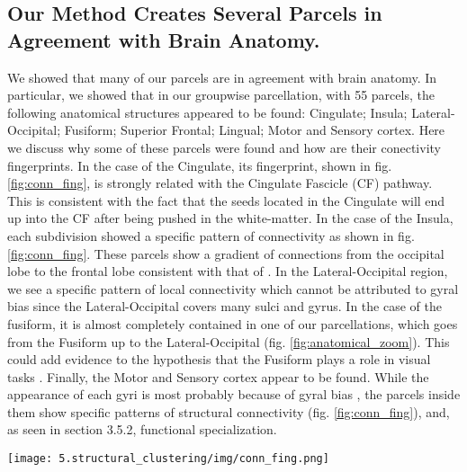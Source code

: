 \subsection{Our Method Creates Several Parcels in Agreement with Brain Anatomy.}
%
We showed that many of our parcels are in agreement with brain anatomy. 
In particular, we showed that in our groupwise parcellation, with 55 parcels,
the following anatomical structures appeared to be found: Cingulate; Insula;
Lateral-Occipital; Fusiform; Superior Frontal; Lingual; Motor and Sensory cortex.
Here we discuss why some of these parcels were found and how are their 
conectivity fingerprints.
In the case of the Cingulate, its fingerprint, shown in fig. \ref{fig:conn_fing}, is
strongly related with the Cingulate Fascicle (CF) pathway. This
is consistent with the 
fact that the seeds located in the Cingulate will end up into the CF after being 
pushed in the white-matter. In the case of the Insula, each subdivision
showed a specific pattern of connectivity as shown in fig. \ref{fig:conn_fing}. 
These parcels show a gradient of connections from the occipital lobe to the frontal
lobe consistent with that of \citet{Ghaziri2015}. In the
Lateral-Occipital region, we see a specific pattern of local connectivity which
cannot be attributed to gyral bias since the Lateral-Occipital covers many sulci
and gyrus. In the case of the fusiform, it is almost completely contained in one
of our parcellations, which goes from the Fusiform up to the Lateral-Occipital
(fig. \ref{fig:anatomical_zoom}). 
This could add evidence to the hypothesis that the Fusiform plays a role in visual
tasks \citep{Kanwisher2006, Yeatman2014}. Finally, the Motor and Sensory cortex appear to be
found. While the
appearance of each gyri is most probably because of gyral bias \citep{VanEssen2014},
the parcels inside them show specific patterns of structural connectivity (fig.
\ref{fig:conn_fing}), and, as seen in section 3.5.2, functional specialization.

\begin{figure*}
    \texttt{[image: 5.structural\_clustering/img/conn\_fing.png]}
    \caption{Connectivity fingerprint for different parcels in our groupwise
             parcellation. The names in the titles are given after the anatomical
             structure that they subdivide (or contain, as with the Fusiform). }
    \label{fig:conn_fing}
\end{figure*}


